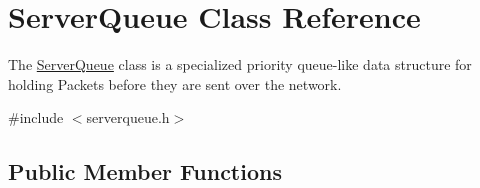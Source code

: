 \hypertarget{class_server_queue}{}\section{Server\+Queue Class Reference}
\label{class_server_queue}


The \hyperlink{class_server_queue}{Server\+Queue} class is a specialized priority queue-\/like data structure for holding Packets before they are sent over the network.  




{\ttfamily \#include $<$serverqueue.\+h$>$}

\subsection*{Public Member Functions}
